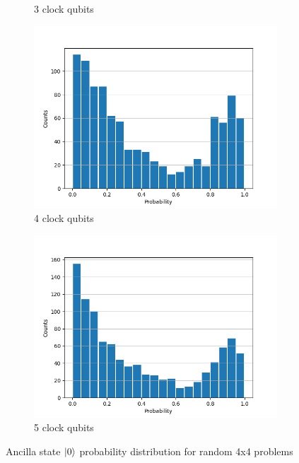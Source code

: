 \documentclass[12pt]{extarticle}
\begin{document}
\begin{figure}[htbp]
\begin{subfigure}[b]{0.45\textwidth}
        \caption{3 clock qubits}
    \end{subfigure}
    \vfill
    \begin{subfigure}[b]{0.45\textwidth}
        \centering
        \includegraphics[width=\textwidth]{images/ancilla_frequency_dist_4x4b5.png}
        \caption{4 clock qubits}
    \end{subfigure}
    \hfill
    \begin{subfigure}[b]{0.45\textwidth}
        \centering
        \includegraphics[width=\textwidth]{images/ancilla_frequency_dist_4x4b6.png}
        \caption{5 clock qubits}
    \end{subfigure}
    \caption{Ancilla state $\ket{0}$ probability distribution for random 4x4 problems}
    \label{fig:ancilla_frequency_dist_4x4}
\end{figure}
\end{document}
